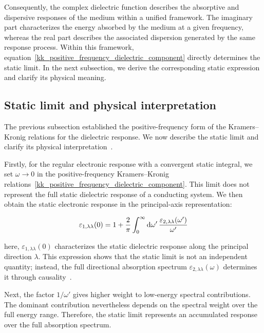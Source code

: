 Consequently, the complex dielectric function describes the absorptive
and dispersive responses of the medium within a unified framework.
The imaginary part characterizes the energy absorbed by the medium at a given frequency,
whereas the real part describes the associated dispersion generated by the same response process.
Within this framework, equation~\eqref{kk_positive_frequency_dielectric_component} directly determines the static limit.
In the next subsection, we derive the corresponding static expression and clarify its physical meaning.

\FloatBarrier
\subsection{Static limit and physical interpretation}

The previous subsection established the positive-frequency form of the Kramers--Kronig relations for the dielectric response.
We now describe the static limit and clarify its physical interpretation~\cite{onishi2024universal,vandenberghe2023two}.

Firstly, for the regular electronic response with a convergent static integral,
we set $\omega\to0$ in the positive-frequency Kramers--Kronig relations~\eqref{kk_positive_frequency_dielectric_component}.
This limit does not represent the full static dielectric response of a conducting system.
We then obtain the static electronic response in the principal-axis representation:

\begin{equation}
    \varepsilon_{1,\lambda\lambda}(0)
    = 1+\frac{2}{\mathrm{\pi}}
    \int_{0}^{\infty}\mathrm{d}{\omega'}\,
    \frac{\varepsilon_{2,\lambda\lambda}(\omega')}{\omega'}
\label{static_limit_from_kramers_kronig}
\end{equation}

here, $\varepsilon_{1,\lambda\lambda}(0)$ characterizes the static dielectric response along the principal direction $\lambda$.
This expression shows that the static limit is not an independent quantity;
instead, the full directional absorption spectrum $\varepsilon_{2,\lambda\lambda}(\omega)$ determines it through causality~\cite{osanloo2021identification}.

Next, the factor $1/\omega'$ gives higher weight to low-energy spectral contributions.
The dominant contribution nevertheless depends on the spectral weight over the full energy range.
Therefore, the static limit represents an accumulated response over the full absorption spectrum.

